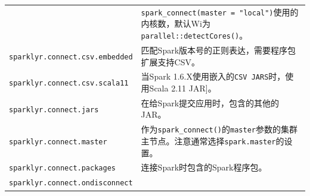\documentclass[
]{article}
\begin{document}
\begin{longtable}[]{@{}ll@{}}
\begin{minipage}[t]{0.47\columnwidth}
\end{minipage} & \begin{minipage}[t]{0.47\columnwidth}\raggedright
\texttt{spark\_connect(master\ =\ "local")}使用的内核数，默认Wi为\texttt{parallel::detectCores()}。\strut
\end{minipage}\tabularnewline
\begin{minipage}[t]{0.47\columnwidth}\raggedright
\texttt{sparklyr.connect.csv.embedded}\strut
\end{minipage} & \begin{minipage}[t]{0.47\columnwidth}\raggedright
匹配Spark版本号的正则表达，需要程序包扩展支持CSV。\strut
\end{minipage}\tabularnewline
\begin{minipage}[t]{0.47\columnwidth}\raggedright
\texttt{sparklyr.connect.csv.scala11}\strut
\end{minipage} & \begin{minipage}[t]{0.47\columnwidth}\raggedright
当Spark 1.6.X使用嵌入的\texttt{CSV\ JARS}时，使用Scala 2.11
JAR{]}。\strut
\end{minipage}\tabularnewline
\begin{minipage}[t]{0.47\columnwidth}\raggedright
\texttt{sparklyr.connect.jars}\strut
\end{minipage} & \begin{minipage}[t]{0.47\columnwidth}\raggedright
在给Spark提交应用时，包含的其他的JAR。\strut
\end{minipage}\tabularnewline
\begin{minipage}[t]{0.47\columnwidth}\raggedright
\texttt{sparklyr.connect.master}\strut
\end{minipage} & \begin{minipage}[t]{0.47\columnwidth}\raggedright
作为\texttt{spark\_connect()}的\texttt{master}参数的集群主节点。注意通常选择\texttt{spark.master}的设置。\strut
\end{minipage}\tabularnewline
\begin{minipage}[t]{0.47\columnwidth}\raggedright
\texttt{sparklyr.connect.packages}\strut
\end{minipage} & \begin{minipage}[t]{0.47\columnwidth}\raggedright
连接Spark时包含的Spark程序包。\strut
\end{minipage}\tabularnewline
\begin{minipage}[t]{0.47\columnwidth}\raggedright
\texttt{sparklyr.connect.ondisconnect}\strut
\end{minipage} & \begin{minipage}[t]{0.47\columnwidth}\raggedright

\end{minipage}
\end{longtable}
\end{document}
